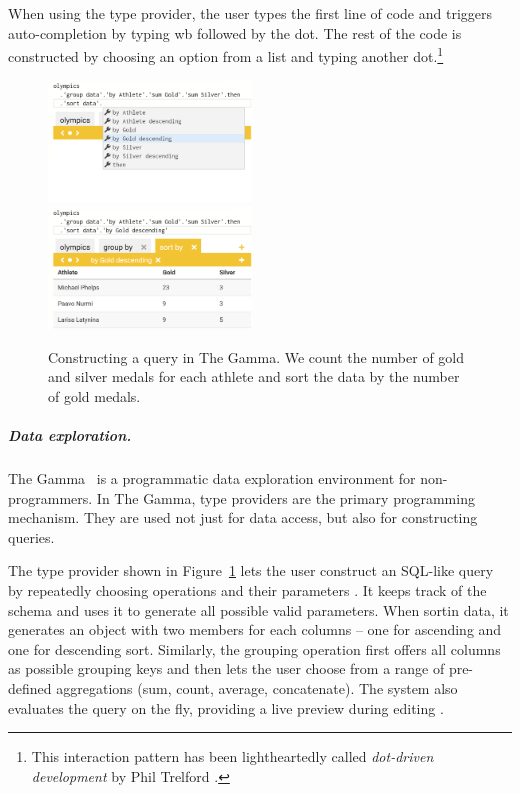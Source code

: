 \documentclass[a4paper,UKenglish,cleveref, autoref, thm-restate]{lipics-v2021}
\newcommand{\ident}[1]{\textsf{#1}}
\begin{document}
When using the type provider, the user types the first line of code and triggers auto-completion
by typing \ident{wb} followed by the dot. The rest of the code is constructed by choosing an
option from a list and typing another dot.\footnote{This interaction pattern has been
lightheartedly called \emph{dot-driven development} by Phil Trelford \cite{seemann-2021-head}.}


\newpage

\begin{figure}[t]
\includegraphics[width=0.48\textwidth]{fig/thegamma1.png}~~
\includegraphics[width=0.48\textwidth]{fig/thegamma2.png}
\caption{Constructing a query in The Gamma. We count the number of gold and silver medals for
each athlete and sort the data by the number of gold medals.}
\label{fig:thegamma}
\end{figure}

\subparagraph{Data exploration.}

The Gamma~\cite{petricek-2022-thegamma} is a programmatic data exploration environment
for non-programmers. In The Gamma, type providers are the primary programming mechanism. They
are used not just for data access, but also for constructing queries.

The type provider shown in Figure~\ref{fig:thegamma} lets the user construct an SQL-like query by
repeatedly choosing operations and their parameters \cite{petricek-2017-dotdriven}. It keeps track
of the schema and uses it to generate all possible valid parameters. When sortin data, it generates
an object with two members for each columns -- one for ascending and one for descending sort.
Similarly, the grouping operation first offers all columns as possible grouping keys and then
lets the user choose from a range of pre-defined aggregations (sum, count, average, concatenate).
The system also evaluates the query on the fly, providing a live preview during editing \cite{petricek-2020-live}.
\end{document}
